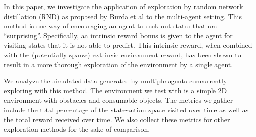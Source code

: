 \documentclass[11pt,journal,compsoc]{IEEEtran}
\begin{document}
In this paper, we investigate the application of exploration by random network distillation (RND) as proposed by Burda et al to the multi-agent setting. This method is one way of encouraging an agent to seek out states that are ``surprising''. Specifically, an intrinsic reward bonus is given to the agent for visiting states that it is not able to predict. This intrinsic reward, when combined with the (potentially sparse) extrinsic environment reward, has been shown to result in a more thorough exploration of the environment by a single agent. 

We analyze the simulated data generated by multiple agents concurrently exploring with this method. The environment we test with is a simple 2D environment with obstacles and consumable objects. The metrics we gather include the total percentage of the state-action space visited over time as well as the total reward received over time. We also collect these metrics for other exploration methods for the sake of comparison.






\end{document}
